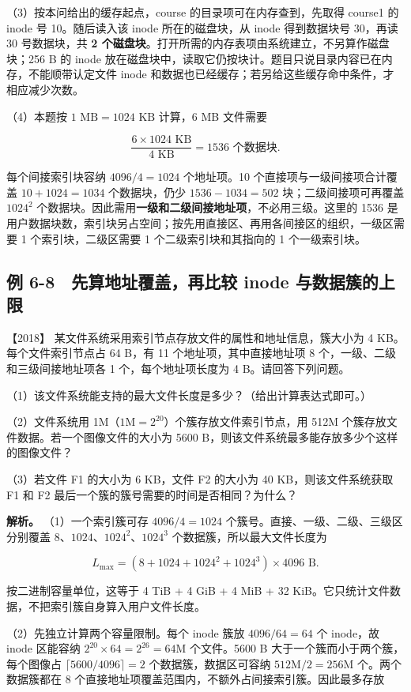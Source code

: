 （3）按本问给出的缓存起点，course 的目录项可在内存查到，先取得 course1 的 inode 号 10。随后读入该 inode 所在的磁盘块，从 inode 得到数据块号 30，再读 30 号数据块，共 \textbf{2 个磁盘块}。打开所需的内存表项由系统建立，不另算作磁盘块；256 B 的 inode 放在磁盘块中，读取它仍按块计。题目只说目录内容已在内存，不能顺带认定文件 inode 和数据也已经缓存；若另给这些缓存命中条件，才相应减少次数。

（4）本题按 \(1\text{ MB}=1024\text{ KB}\) 计算，6 MB 文件需要

\[\frac{6\times1024\text{ KB}}{4\text{ KB}}=1536\text{ 个数据块}.\]

每个间接索引块容纳 \(4096/4=1024\) 个地址项。10 个直接项与一级间接项合计覆盖 \(10+1024=1034\) 个数据块，仍少 \(1536-1034=502\) 块；二级间接项可再覆盖 \(1024^2\) 个数据块。因此需用\textbf{一级和二级间接地址项}，不必用三级。这里的 1536 是用户数据块数，索引块另占空间；按先用直接区、再用各间接区的组织，一级区需要 1 个索引块，二级区需要 1 个二级索引块和其指向的 1 个一级索引块。

\subsection{例 6-8　先算地址覆盖，再比较 inode 与数据簇的上限}\label{os-ex6-8}

\noindent{}【2018】 某文件系统采用索引节点存放文件的属性和地址信息，簇大小为 4 KB。每个文件索引节点占 64 B，有 11 个地址项，其中直接地址项 8 个，一级、二级和三级间接地址项各 1 个，每个地址项长度为 4 B。请回答下列问题。

（1）该文件系统能支持的最大文件长度是多少？（给出计算表达式即可。）

（2）文件系统用 1M（\(1\mathrm{M}=2^{20}\)）个簇存放文件索引节点，用 512M 个簇存放文件数据。若一个图像文件的大小为 5600 B，则该文件系统最多能存放多少个这样的图像文件？

（3）若文件 F1 的大小为 6 KB，文件 F2 的大小为 40 KB，则该文件系统获取 F1 和 F2 最后一个簇的簇号需要的时间是否相同？为什么？


\textbf{解析。} （1）一个索引簇可存 \(4096/4=1024\) 个簇号。直接、一级、二级、三级区分别覆盖 \(8\)、\(1024\)、\(1024^2\)、\(1024^3\) 个数据簇，所以最大文件长度为

\[L_{\max}=(8+1024+1024^2+1024^3)\times4096\text{ B}.\]

按二进制容量单位，这等于 4 TiB + 4 GiB + 4 MiB + 32 KiB。它只统计文件数据，不把索引簇自身算入用户文件长度。

（2）先独立计算两个容量限制。每个 inode 簇放 \(4096/64=64\) 个 inode，故 inode 区能容纳 \(2^{20}\times64=2^{26}=64\mathrm{M}\) 个文件。5600 B 大于一个簇而小于两个簇，每个图像占 \(\lceil5600/4096\rceil=2\) 个数据簇，数据区可容纳 \(512\mathrm{M}/2=256\mathrm{M}\) 个。两个数据簇都在 8 个直接地址项覆盖范围内，不额外占间接索引簇。因此最多存放

